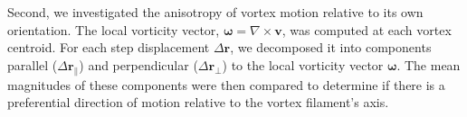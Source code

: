\documentclass[]{article}
\begin{document}
Second, we investigated the anisotropy of vortex motion relative to its own orientation. The local vorticity vector, $\boldsymbol{\omega} = \nabla \times \mathbf{v}$, was computed at each vortex centroid. For each step displacement $\Delta\mathbf{r}$, we decomposed it into components parallel ($\Delta\mathbf{r}_\parallel$) and perpendicular ($\Delta\mathbf{r}_\perp$) to the local vorticity vector $\boldsymbol{\omega}$. The mean magnitudes of these components were then compared to determine if there is a preferential direction of motion relative to the vortex filament's axis.
\end{document}
